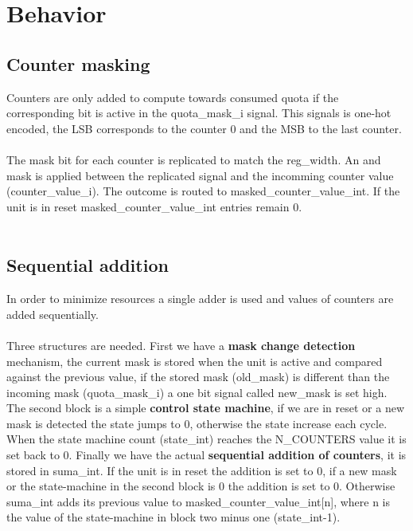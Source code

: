 \section{Behavior}
\subsection{Counter masking}
Counters are only added to compute towards consumed quota if the corresponding bit is active in the quota\_mask\_i signal. This signals is one-hot encoded, the LSB corresponds to the counter 0 and the MSB to the last counter.\\
\\
The mask bit for each counter is replicated to match the reg\_width. An and mask is applied between the replicated signal and the incomming counter value (counter\_value\_i). The outcome is routed to  masked\_counter\_value\_int. If the unit is in reset  masked\_counter\_value\_int entries remain 0.\\
\\
\subsection{Sequential addition}
In order to minimize resources a single adder is used and values of counters are added sequentially.\\
\\
Three structures are needed. First we have a \textbf{mask change detection} mechanism, the current mask is stored when the unit is active and compared against the previous value, if the stored mask (old\_mask) is different than the incoming mask (quota\_mask\_i) a one bit signal called new\_mask is set high. The second block is a simple \textbf{control state machine}, if we are in reset or a new mask is detected the state jumps to 0, otherwise the state increase each cycle. When the state machine count (state\_int) reaches the N\_COUNTERS value it is set back to 0. Finally we have the actual\textbf{ sequential addition of counters}, it is stored in suma\_int. If the unit is in reset the addition is set to 0, if a new mask or the state-machine in the second block is 0 the addition is set to 0. Otherwise suma\_int adds its previous value to masked\_counter\_value\_int[n], where n is the value of the state-machine in block two minus one (state\_int-1).

